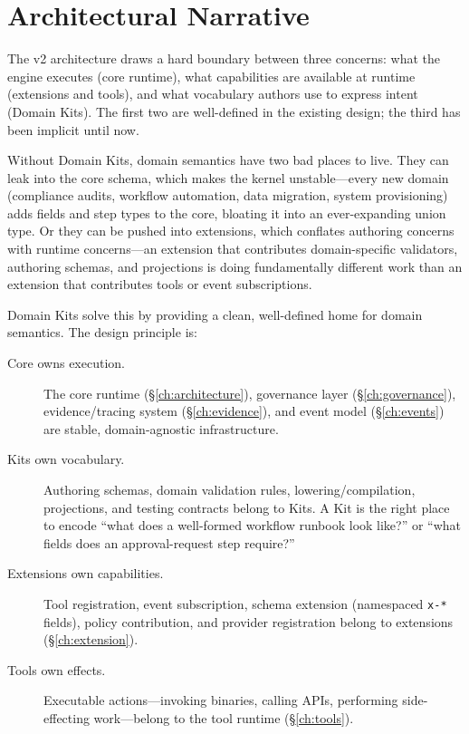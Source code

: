 \section{Architectural Narrative}
\label{sec:kit-narrative}

The v2 architecture draws a hard boundary between three concerns: what the
engine executes (core runtime), what capabilities are available at runtime
(extensions and tools), and what vocabulary authors use to express intent
(Domain Kits).  The first two are well-defined in the existing design; the
third has been implicit until now.

Without Domain Kits, domain semantics have two bad places to live.  They can
leak into the core schema, which makes the kernel unstable---every new domain
(compliance audits, workflow automation, data migration, system provisioning)
adds fields and step types to the core, bloating it into an ever-expanding
union type.  Or they can be pushed into extensions, which conflates authoring
concerns with runtime concerns---an extension that contributes domain-specific
validators, authoring schemas, and projections is doing fundamentally different
work than an extension that contributes tools or event subscriptions.

Domain Kits solve this by providing a clean, well-defined home for domain
semantics.  The design principle is:

\begin{description}
  \item[Core owns execution.] The core runtime
    (\S\ref{ch:architecture}), governance layer (\S\ref{ch:governance}),
    evidence/tracing system (\S\ref{ch:evidence}), and event model
    (\S\ref{ch:events}) are stable, domain-agnostic infrastructure.

  \item[Kits own vocabulary.] Authoring schemas, domain validation rules,
    lowering/compilation, projections, and testing contracts belong to Kits.  A
    Kit is the right place to encode ``what does a well-formed workflow runbook
    look like?'' or ``what fields does an approval-request step require?''

  \item[Extensions own capabilities.] Tool registration, event subscription,
    schema extension (namespaced \texttt{x-*} fields), policy contribution, and
    provider registration belong to extensions (\S\ref{ch:extension}).

  \item[Tools own effects.] Executable actions---invoking binaries, calling
    APIs, performing side-effecting work---belong to the tool runtime
    (\S\ref{ch:tools}).
\end{description}

